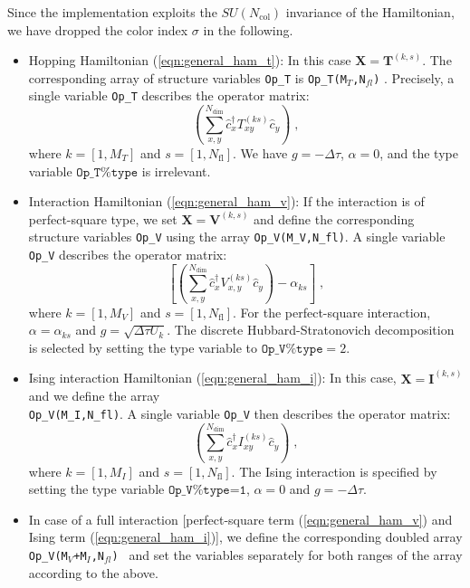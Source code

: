 Since the implementation exploits the $SU(N_{\mathrm{col}})$ invariance of the Hamiltonian, we have dropped the color index $\sigma$ in the following.
\begin{itemize}
\item Hopping Hamiltonian (\ref{eqn:general_ham_t}): 
In this case $\bm{X}=\bm{T}^{(k,s)}$. The corresponding array of structure variables \texttt{Op\_T} is  \texttt{Op\_T(M$_T$,N$_{fl}$)} . 
Precisely, a single variable  \texttt{Op\_T}  describes the operator matrix:
\begin{equation}
            \left( \sum_{x,y}^{N_{\mathrm{dim}}} \hat{c}^{\dagger}_x T_{xy}^{(ks)} \hat{c}^{\phantom{\dagger}}_{y}  \right)  \;,
\end{equation} 
where $k=[1, M_{T}]$ and $s=[1, N_{\mathrm{fl}}]$.
We have $g=-\Delta \tau$, $\alpha = 0$, and the type variable $\texttt{Op\_T\%type}$  is irrelevant. 



\item Interaction Hamiltonian (\ref{eqn:general_ham_v}):
If the interaction is of perfect-square type, we set  ${\bm X}  = \bm{V}^{(k,s)}$ 
and  define the corresponding structure variables \texttt{Op\_V}  using the array \texttt{Op\_V(M\_V,N\_{fl})}.
A single variable  \texttt{Op\_V}  describes the operator matrix:
\begin{equation}
             \left[ \left( \sum_{x,y}^{N_{\mathrm{dim}}} \hat{c}^{\dagger}_x V_{x,y}^{(ks)} \hat{c}^{\phantom{\dagger}}_{y}  \right) - \alpha_{ks} \right]  \;,
\end{equation} 
where $k=[1, M_{V}]$ and $s=[1, N_{\mathrm{fl}}]$. For the perfect-square interaction, $\alpha = \alpha_{ks}$ and $g = \sqrt{\Delta \tau  U_k}$. 
The discrete Hubbard-Stratonovich decomposition is selected by setting the type variable to $\texttt{Op\_V\%type}=2$.

\item Ising interaction Hamiltonian (\ref{eqn:general_ham_i}):
In this case, $\bm{X}  = \bm{I}^{(k,s)} $ and we define the array\\ \texttt{Op\_V(M\_I,N\_{fl})}.  
A single variable  \texttt{Op\_V} then  describes the operator matrix:
\begin{equation}
            \left( \sum_{x,y}^{N_{\mathrm{dim}}} \hat{c}^{\dagger}_x I_{xy}^{(ks)} \hat{c}^{\phantom{\dagger}}_{y}  \right)  \;,
\end{equation} 
where $k=[1, M_{I}]$ and $s=[1, N_{\mathrm{fl}}]$.
The Ising interaction is specified by setting the type variable  $\texttt{Op\_V\%type=1}$, $\alpha = 0$ and $g = -\Delta \tau$.  

\item In case of a full interaction [perfect-square term (\ref{eqn:general_ham_v}) and Ising term (\ref{eqn:general_ham_i})], we  define  the corresponding doubled array \texttt{Op\_V(M$_V$+M$_I$,N$_{fl}$) } and set the variables separately for both ranges of the array according to the above.  

\end{itemize}

